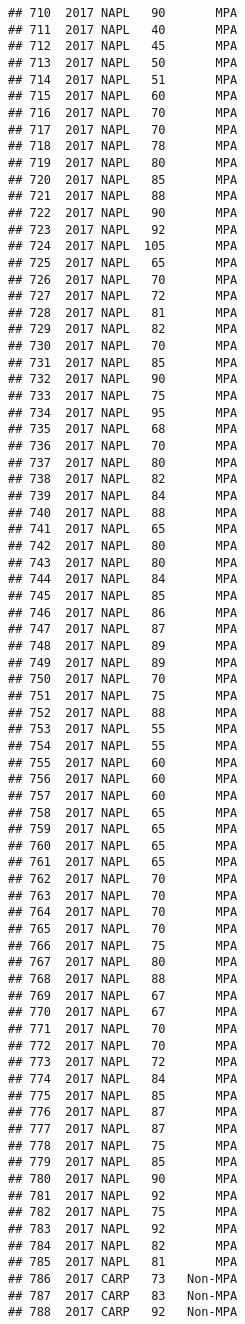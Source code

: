 \documentclass[]{article}
\begin{document}
\begin{verbatim}
## 710  2017 NAPL   90       MPA
## 711  2017 NAPL   40       MPA
## 712  2017 NAPL   45       MPA
## 713  2017 NAPL   50       MPA
## 714  2017 NAPL   51       MPA
## 715  2017 NAPL   60       MPA
## 716  2017 NAPL   70       MPA
## 717  2017 NAPL   70       MPA
## 718  2017 NAPL   78       MPA
## 719  2017 NAPL   80       MPA
## 720  2017 NAPL   85       MPA
## 721  2017 NAPL   88       MPA
## 722  2017 NAPL   90       MPA
## 723  2017 NAPL   92       MPA
## 724  2017 NAPL  105       MPA
## 725  2017 NAPL   65       MPA
## 726  2017 NAPL   70       MPA
## 727  2017 NAPL   72       MPA
## 728  2017 NAPL   81       MPA
## 729  2017 NAPL   82       MPA
## 730  2017 NAPL   70       MPA
## 731  2017 NAPL   85       MPA
## 732  2017 NAPL   90       MPA
## 733  2017 NAPL   75       MPA
## 734  2017 NAPL   95       MPA
## 735  2017 NAPL   68       MPA
## 736  2017 NAPL   70       MPA
## 737  2017 NAPL   80       MPA
## 738  2017 NAPL   82       MPA
## 739  2017 NAPL   84       MPA
## 740  2017 NAPL   88       MPA
## 741  2017 NAPL   65       MPA
## 742  2017 NAPL   80       MPA
## 743  2017 NAPL   80       MPA
## 744  2017 NAPL   84       MPA
## 745  2017 NAPL   85       MPA
## 746  2017 NAPL   86       MPA
## 747  2017 NAPL   87       MPA
## 748  2017 NAPL   89       MPA
## 749  2017 NAPL   89       MPA
## 750  2017 NAPL   70       MPA
## 751  2017 NAPL   75       MPA
## 752  2017 NAPL   88       MPA
## 753  2017 NAPL   55       MPA
## 754  2017 NAPL   55       MPA
## 755  2017 NAPL   60       MPA
## 756  2017 NAPL   60       MPA
## 757  2017 NAPL   60       MPA
## 758  2017 NAPL   65       MPA
## 759  2017 NAPL   65       MPA
## 760  2017 NAPL   65       MPA
## 761  2017 NAPL   65       MPA
## 762  2017 NAPL   70       MPA
## 763  2017 NAPL   70       MPA
## 764  2017 NAPL   70       MPA
## 765  2017 NAPL   70       MPA
## 766  2017 NAPL   75       MPA
## 767  2017 NAPL   80       MPA
## 768  2017 NAPL   88       MPA
## 769  2017 NAPL   67       MPA
## 770  2017 NAPL   67       MPA
## 771  2017 NAPL   70       MPA
## 772  2017 NAPL   70       MPA
## 773  2017 NAPL   72       MPA
## 774  2017 NAPL   84       MPA
## 775  2017 NAPL   85       MPA
## 776  2017 NAPL   87       MPA
## 777  2017 NAPL   87       MPA
## 778  2017 NAPL   75       MPA
## 779  2017 NAPL   85       MPA
## 780  2017 NAPL   90       MPA
## 781  2017 NAPL   92       MPA
## 782  2017 NAPL   75       MPA
## 783  2017 NAPL   92       MPA
## 784  2017 NAPL   82       MPA
## 785  2017 NAPL   81       MPA
## 786  2017 CARP   73   Non-MPA
## 787  2017 CARP   83   Non-MPA
## 788  2017 CARP   92   Non-MPA

\end{verbatim}
\end{document}
